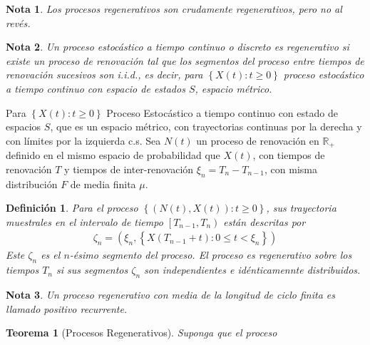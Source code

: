 \documentclass{article}
\newtheorem{Def}{Definición}
\newtheorem{Teo}{Teorema}
\newtheorem{Note}{Nota}
\newcommand{\rea}{\mathbb{R}}
\begin{document}
\begin{Note}
Los procesos regenerativos son crudamente regenerativos, pero no al rev\'es.
\end{Note}


\begin{Note}
Un proceso estoc\'astico a tiempo continuo o discreto es regenerativo si existe un proceso de renovaci\'on  tal que los segmentos del proceso entre tiempos de renovaci\'on sucesivos son i.i.d., es decir, para $\left\{X\left(t\right):t\geq0\right\}$ proceso estoc\'astico a tiempo continuo con espacio de estados $S$, espacio m\'etrico.
\end{Note}

Para $\left\{X\left(t\right):t\geq0\right\}$ Proceso Estoc\'astico a tiempo continuo con estado de espacios $S$, que es un espacio m\'etrico, con trayectorias continuas por la derecha y con l\'imites por la izquierda c.s. Sea $N\left(t\right)$ un proceso de renovaci\'on en $\rea_{+}$ definido en el mismo espacio de probabilidad que $X\left(t\right)$, con tiempos de renovaci\'on $T$ y tiempos de inter-renovaci\'on $\xi_{n}=T_{n}-T_{n-1}$, con misma distribuci\'on $F$ de media finita $\mu$.



\begin{Def}
Para el proceso $\left\{\left(N\left(t\right),X\left(t\right)\right):t\geq0\right\}$, sus trayectoria muestrales en el intervalo de tiempo $\left[T_{n-1},T_{n}\right)$ est\'an descritas por
\begin{eqnarray*}
\zeta_{n}=\left(\xi_{n},\left\{X\left(T_{n-1}+t\right):0\leq t<\xi_{n}\right\}\right)
\end{eqnarray*}
Este $\zeta_{n}$ es el $n$-\'esimo segmento del proceso. El proceso es regenerativo sobre los tiempos $T_{n}$ si sus segmentos $\zeta_{n}$ son independientes e id\'enticamennte distribuidos.
\end{Def}

\begin{Note}
Un proceso regenerativo con media de la longitud de ciclo finita es llamado positivo recurrente.
\end{Note}

\begin{Teo}[Procesos Regenerativos]
Suponga que el proceso
\end{Teo}
\end{document}
